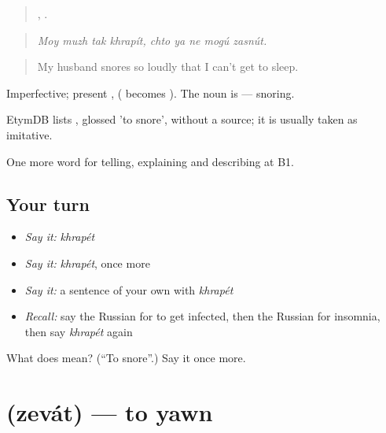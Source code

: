 \begin{quote}
   ,     .
\end{quote}

\begin{quote}
\emph{Moy muzh tak khrapít, chto ya ne mogú zasnút.}
\end{quote}

\begin{quote}
My husband snores so loudly that I can't get to sleep.
\end{quote}

Imperfective; present ,  ( becomes ). The noun is \emph{} — snoring.

\begin{cousinweb}
EtymDB lists \emph{}, glossed 'to snore', without a source; it is usually taken as imitative.
\end{cousinweb}

\begin{grammarlens}[title={What you've built}]
One more word for telling, explaining and describing at B1.
\end{grammarlens}

\subsection*{Your turn}
\begin{itemize}
\raggedright
  \item \emph{Say it:} \emph{khrapét}
  \item \emph{Say it:} \emph{khrapét}, once more
  \item \emph{Say it:} a sentence of your own with \emph{khrapét}
  \item \emph{Recall:} say the Russian for to get infected, then the Russian for insomnia, then say \emph{khrapét} again
\end{itemize}

\begin{tcolorbox}[breakable,colback=teal!4,colframe=teal!35!black,title={Before you move on}]
What does  mean? (\textquotedblleft{}To snore\textquotedblright{}.) Say it once more.
\end{tcolorbox}
\section[\texorpdfstring{\ru{зевать} (zevát)}{зевать (zevát)}]{ (zevát) — to yawn}

